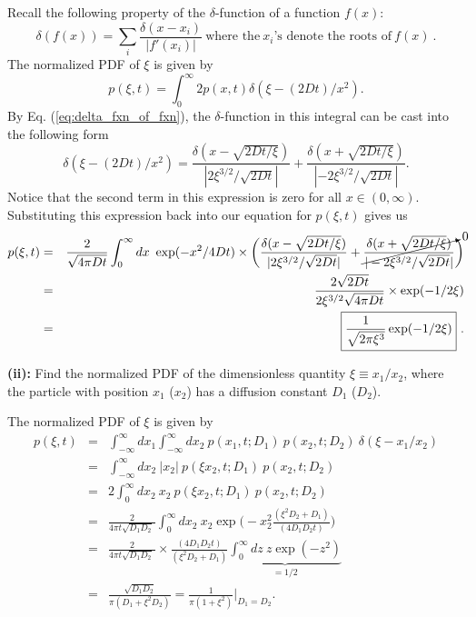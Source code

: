 Recall the following property of the $\delta$-function of a function $f(x)$:
\begin{equation}
\boxed{\delta(f(x)) = \sum_{i} \frac{\delta(x-x_i)}{|f'(x_i)|}~\text{where the}~x_i\text{'s denote the roots of}~f(x)}~. \label{eq:delta_fxn_of_fxn}
\end{equation}
The normalized PDF of $\xi$ is given by
\begin{equation}
p(\xi, t) = \int_{0}^{\infty} 2 p(x, t) \delta(\xi-(2Dt)/x^2). \nonumber
\end{equation}
By Eq. (\ref{eq:delta_fxn_of_fxn}), the $\delta$-function in this integral can be cast into the following form
\begin{equation}
\delta(\xi-(2Dt)/x^2) = \frac{\delta(x-\sqrt{2Dt/\xi})}{|2 \xi^{3/2}/\sqrt{2Dt}|} + \frac{\delta(x+\sqrt{2Dt/\xi})}{|-2 \xi^{3/2}/\sqrt{2Dt}|}. \nonumber
\end{equation}
Notice that the second term in this expression is zero for all $x\in(0, \infty)$. Substituting this expression back into our equation for $p(\xi, t)$ gives us
\begin{eqnarray}
p(\xi, t) &=& \frac{2}{\sqrt{4 \pi D t}} \int_{0}^{\infty} dx~\exp(-x^2/4Dt)\times \bigg(\frac{\delta(x-\sqrt{2Dt/\xi})}{|2 \xi^{3/2}/\sqrt{2Dt}|} + \cancelto{0}{\frac{\delta(x+\sqrt{2Dt/\xi})}{|-2 \xi^{3/2}/\sqrt{2Dt}|}}\bigg)%
\nonumber \\
&=& \frac{2\sqrt{2 D t}}{ 2 \xi^{3/2} \sqrt{4 \pi D t}} \times \exp(-1/2\xi) \nonumber \\
&=& \boxed{ \frac{1}{\sqrt{2 \pi \xi^3}} \exp(-1/2\xi)}~.
\end{eqnarray}

\textbf{(ii):} Find the normalized PDF of the dimensionless quantity $\xi \equiv x_1/x_2$, where the particle with position $x_1$ ($x_2$) has a diffusion constant $D_1$ ($D_2$).

The normalized PDF of $\xi$ is given by
\begin{eqnarray}
p(\xi, t) &=&  \int_{-\infty}^{\infty} dx_1 \int_{-\infty}^{\infty} dx_2~p(x_1, t;D_1)~p(x_2, t; D_2) ~\delta(\xi-x_1/x_2) \nonumber \\
&=& \int_{-\infty}^{\infty} dx_2~|x_2|~p(\xi x_2, t;D_1)~p(x_2, t;D_2) \nonumber \\
&=& 2 \int_{0}^{\infty} dx_2~x_2~p(\xi x_2, t;D_1)~p(x_2, t;D_2) \nonumber \\
&=& \frac{2}{4 \pi t \sqrt{D_1 D_2}~}\int_{0}^{\infty} dx_2~x_2 \exp \bigg( -x_2^2\frac{(\xi^2 D_2 + D_1)}{(4 D_1 D_2 t)} \bigg) \nonumber \\
&=& \frac{2}{4 \pi t \sqrt{D_1 D_2}~} \times \frac{(4 D_1 D_2 t)}{(\xi^2 D_2 + D_1) } \underbrace{\int_{0}^{\infty} dz ~z \exp(-z^2)}_{=1/2} \nonumber \\
&=& \boxed{\frac{\sqrt{D_1 D_2}}{ \pi(D_1 + \xi^2 D_2)}} = \frac{1}{\pi(1+\xi^2)}\bigg|_{D_1=D_2}.
\end{eqnarray}

